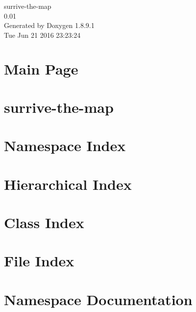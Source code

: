 \documentclass[twoside]{book}
\newcommand{\+}{\discretionary{\mbox{\scriptsize$\hookleftarrow$}}{}{}}
\newcommand{\clearemptydoublepage}{%
  \newpage{\pagestyle{empty}\cleardoublepage}%
}
\begin{document}
\hypersetup{pageanchor=false,
             bookmarks=true,
             bookmarksnumbered=true,
             pdfencoding=unicode
            }
\begin{titlepage}
\vspace*{7cm}
\begin{center}%
{\Large surrive-\/the-\/map \\[1ex]\large 0.\+01 }\\
\vspace*{1cm}
{\large Generated by Doxygen 1.8.9.1}\\
\vspace*{0.5cm}
{\small Tue Jun 21 2016 23:23:24}\\
\end{center}
\end{titlepage}
\clearemptydoublepage
\tableofcontents
\clearemptydoublepage
{}
\hypersetup{pageanchor=true}

\chapter{Main Page}
\label{index}\hypertarget{index}{}
\chapter{surrive-\/the-\/map}
\label{md__c_1__users__foto__documents__git_hub_surrive-the-map__r_e_a_d_m_e}
\hypertarget{md__c_1__users__foto__documents__git_hub_surrive-the-map__r_e_a_d_m_e}{}

\chapter{Namespace Index}

\chapter{Hierarchical Index}

\chapter{Class Index}

\chapter{File Index}

\chapter{Namespace Documentation}

\end{document}
